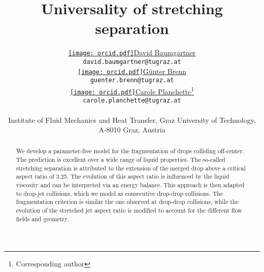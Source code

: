 \documentclass{article}
\title{Universality of stretching separation}
\author{ \href{https://orcid.org/0000-0003-2505-3742}{\texttt{[image: orcid.pdf]}\hspace{1mm}David Baumgartner}\\
	\texttt{david.baumgartner@tugraz.at} \\
	\And
	\href{https://orcid.org/0000-0001-7576-0790}{\texttt{[image: orcid.pdf]}\hspace{1mm}G\"unter Brenn} \\
	\texttt{guenter.brenn@tugraz.at} \\
	\And
		\href{https://orcid.org/0000-0002-3974-5742}{\texttt{[image: orcid.pdf]}\hspace{1mm}Carole Planchette}\thanks{Corresponding author}  \\
	\texttt{carole.planchette@tugraz.at} \\
	\\
	Institute of Fluid Mechanics and Heat Transfer, Graz University of Technology, A-8010 Graz, Austria
	
}
\begin{document}
\maketitle

\begin{abstract}
We develop a parameter-free model for the fragmentation of drops colliding off-center.  The prediction is excellent  over  a wide range of liquid properties. The so-called stretching separation is attributed to the extension of the merged drop above a critical aspect ratio of {3.25}. The evolution of this aspect ratio  {is influenced by the liquid viscosity} and can be interpreted via an energy balance. This approach is then adapted to drop-jet collisions, which we model as consecutive drop-drop collisions. {The fragmentation criterion is similar the one observed at drop-drop collisions}, while the evolution of the stretched jet aspect ratio is modified to account for the different flow fields and geometry. 

\end{abstract}


\end{document}
